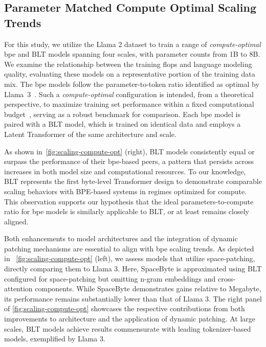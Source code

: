 \subsection{Parameter Matched Compute Optimal Scaling Trends}
\label{section:parameter-matched-scaling}
For this study, we utilize the Llama 2 dataset to train a range of \textit{compute-optimal} bpe and {\textsc BLT} models spanning four scales, with parameter counts from 1B to 8B. We examine the relationship between the training flops and language modeling quality, evaluating these models on a representative portion of the training data mix. The bpe models follow the parameter-to-token ratio identified as optimal by Llama~3~\citep{dubey2024llama}. Such a \textit{compute-optimal} configuration is intended, from a theoretical perspective, to maximize training set performance within a fixed computational budget~\citep{hoffmann2022training}, serving as a robust benchmark for comparison. Each bpe model is paired with a {\textsc BLT} model, which is trained on identical data and employs a Latent Transformer of the same architecture and scale.

As shown in~\autoref{fig:scaling-compute-opt} (right), {\textsc BLT} models consistently equal or surpass the performance of their bpe-based peers, a pattern that persists across increases in both model size and computational resources. To our knowledge, {\textsc BLT} represents the first byte-level Transformer design to demonstrate comparable scaling behaviors with BPE-based systems in regimes optimized for compute. This observation supports our hypothesis that the ideal parameters-to-compute ratio for bpe models is similarly applicable to {\textsc BLT}, or at least remains closely aligned.

Both enhancements to model architectures and the integration of dynamic patching mechanisms are essential to align with bpe scaling trends. As depicted in ~\autoref{fig:scaling-compute-opt} (left), we assess models that utilize space-patching, directly comparing them to Llama 3. Here, SpaceByte \citep{slagle2024spacebyte} is approximated using {\textsc BLT} configured for space-patching but omitting n-gram embeddings and cross-attention components. While SpaceByte demonstrates gains relative to Megabyte, its performance remains substantially lower than that of Llama 3. The right panel of \autoref{fig:scaling-compute-opt} showcases the respective contributions from both improvements to architecture and the application of dynamic patching. At large scales, {\textsc BLT} models achieve results commensurate with leading tokenizer-based models, exemplified by Llama 3.

